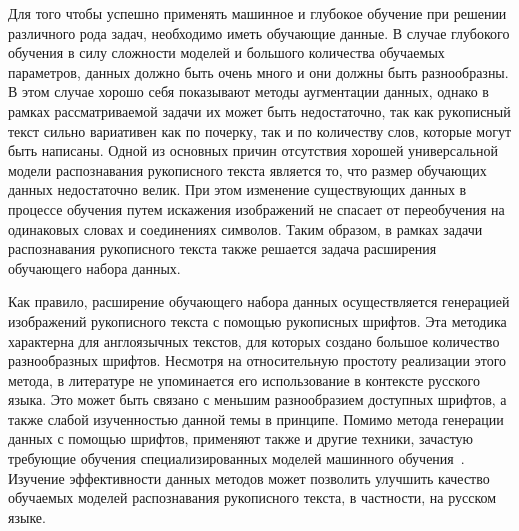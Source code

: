 Для того чтобы успешно применять машинное и глубокое обучение при решении различного рода задач, необходимо иметь обучающие данные.
В случае глубокого обучения в силу сложности моделей и большого количества обучаемых параметров, данных должно быть очень много и они должны быть разнообразны.
В этом случае хорошо себя показывают методы аугментации данных, однако в рамках рассматриваемой задачи их может быть недостаточно,
так как рукописный текст сильно вариативен как по почерку, так и по количеству слов, которые могут быть написаны.
Одной из основных причин отсутствия хорошей универсальной модели распознавания рукописного текста является то, что размер обучающих данных недостаточно велик.
При этом изменение существующих данных в процессе обучения путем искажения изображений не спасает от переобучения на одинаковых словах и соединениях символов.
Таким образом, в рамках задачи распознавания рукописного текста также решается задача расширения обучающего набора данных.

Как правило, расширение обучающего набора данных осуществляется генерацией изображений рукописного текста с помощью рукописных шрифтов.
Эта методика характерна для англоязычных текстов, для которых создано большое количество разнообразных шрифтов.
Несмотря на относительную простоту реализации этого метода, в литературе не упоминается его использование в контексте русского языка.
Это может быть связано с меньшим разнообразием доступных шрифтов, а также слабой изученностью данной темы в принципе.
Помимо метода генерации данных с помощью шрифтов, применяют также и другие техники,
зачастую требующие обучения специализированных моделей машинного обучения~\cite{shonenkov2021stackmix,fogel2020scrabblegan}.
Изучение эффективности данных методов может позволить улучшить качество обучаемых моделей распознавания рукописного текста,
в частности, на русском языке.
